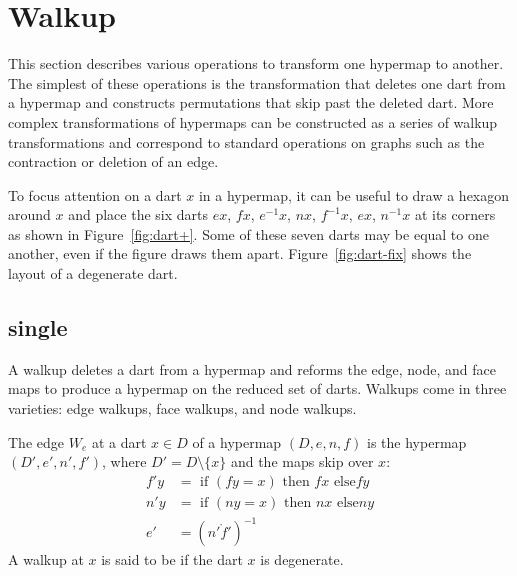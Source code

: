 \section{Walkup}

This section describes various operations to transform one hypermap to
another.  The simplest of these operations is the 
transformation that deletes one dart from a hypermap and constructs
permutations that skip past the deleted dart.  More complex
transformations of hypermaps can be constructed as a series of walkup
transformations and correspond to standard operations on graphs such as the
contraction or deletion of an edge.

To focus attention on a dart $x$ in a hypermap, it can be useful to draw a
hexagon around $x$ and place the six darts $e x$, $f x$, $e^{-1} x$,
$n x$, $f^{-1} x$, $e x$, $n^{-1} x$ at its corners as shown in
Figure~\ref{fig:dart+}.  Some of these seven darts may be equal to one
another, even if the figure draws them apart.
Figure~\ref{fig:dart-fix} shows the layout of a degenerate dart.
%

\figLMGQYKG %

\figANDKKER %



\subsection{single}

A walkup deletes a dart from a hypermap and reforms the edge, node,
and face maps to produce a hypermap on the reduced set of darts.
Walkups come in three varieties: edge walkups, face walkups, and node
walkups.

\begin{definition}
The edge 
$W_e$ at  a dart $x\in D$ of a hypermap $(D,e,n,f)$ is the hypermap
$(D',e',n',f')$, where $D' = D\setminus\{x\}$ and the maps skip over $x$:
\begin{align*}
f' y &= \text{ if } (f y =  x) \text{ then } f x \text{ else
} f y\\
n' y &= \text{ if } (n y = x) \text{ then } n x \text{ else
} n y\\
e' &= (n'\ocirc f')^{-1}
\end{align*}
A walkup at $x$ is said to be  if the dart $x$ is
degenerate.  
%
%
%
%
%
\end{definition}


